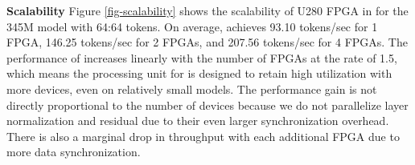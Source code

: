\textbf{Scalability}
Figure \ref{fig-scalability} shows the scalability of U280 FPGA in \sysname{} for the 345M model with 64:64 tokens. On average, \sysname{} achieves 93.10 tokens/sec for 1 FPGA, 146.25 tokens/sec for 2 FPGAs, and 207.56 tokens/sec for 4 FPGAs. The performance of \sysname{} increases linearly with the number of FPGAs at the rate of 1.5, which means the processing unit for \sysname{} is designed to retain high utilization with more devices, even on relatively small models. The performance gain is not directly proportional to the number of devices because we do not parallelize layer normalization and residual due to their even larger synchronization overhead. There is also a marginal drop in throughput with each additional FPGA due to more data synchronization. 



